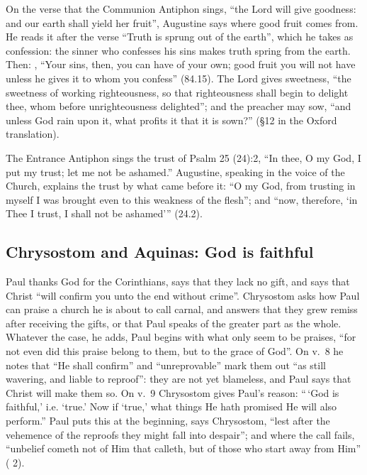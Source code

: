 On the verse that the Communion Antiphon sings, ``the Lord will give
goodness: and our earth shall yield her fruit'', Augustine says where good
fruit comes from. He reads it after the verse ``Truth is sprung out of the earth'', which he
takes as confession: the sinner who confesses his sins makes truth spring
from the earth. Then: , ``Your sins, then, you can have
of your own; good fruit you will not have unless he gives it to whom you
confess'' (84.15). The Lord gives sweetness, ``the sweetness of working
righteousness, so that righteousness shall begin to delight thee, whom before
unrighteousness delighted''; and the preacher may sow, ``and unless God rain
upon it, what profits it that it is sown?'' (§12 in the Oxford translation).

The Entrance Antiphon sings the trust of Psalm 25 (24):2, ``In thee, O my
God, I put my trust; let me not be ashamed.'' Augustine, speaking in the
voice of the Church, explains the trust by what came before it: ``O my God, from
trusting in myself I was brought even to this weakness of the flesh''; and
``now, therefore, `in Thee I trust, I shall not be ashamed''' (24.2).

\subsection{Chrysostom and Aquinas: God is faithful}

Paul thanks God for the Corinthians, says that they lack no gift, and says
that Christ ``will confirm you unto the end without crime''. Chrysostom asks
how Paul can praise a church he is about to call carnal, and answers that
they grew remiss after receiving the gifts, or that Paul speaks of the
greater part as the whole. Whatever the case, he adds, Paul begins with what
only seem to be praises, ``for not even did this praise belong to them, but
to the grace of God''. On v.~8 he notes that ``He shall confirm'' and
``unreprovable'' mark them out ``as still wavering, and liable to reproof'':
they are not yet blameless, and Paul says that Christ will make them so. On
v.~9 Chrysostom gives Paul's reason: ``\,`God is faithful,' i.e. `true.' Now
if `true,' what things He hath promised He will also perform.'' Paul puts
this at the beginning, says Chrysostom, ``lest after the vehemence of the
reproofs they might fall into despair''; and where the call fails,
``unbelief cometh not of Him that calleth, but of those who start away from
Him'' ( 2).

